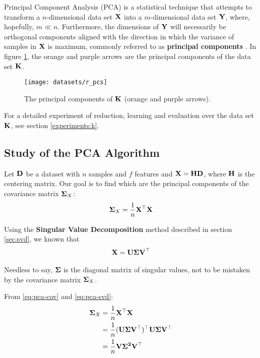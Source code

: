 Principal Component Analysis (PCA) is a statistical technique that attempts to transform a $n$-dimensional data set $\mathbf{X}$ into a $m$-dimensional data set $\mathbf{Y}$, where, hopefully, $m \ll n$. Furthermore, the dimensions of $\mathbf{Y}$ will necessarily be orthogonal components aligned with the direction in which the variance of samples in $\mathbf{X}$ is maximum, commonly referred to as \textbf{principal components} \cite{pca1989}. In figure \ref{fig:datasetrpc}, the orange and purple arrows are the principal components of the data set $\mathbf{K}$.

\begin{figure}[H]
	\centering
	\captionsetup{justification=centering}
	\texttt{[image: datasets/r\_pcs]}
	\caption{The principal components of $\mathbf{K}$ (orange and purple arrows).}
	\label{fig:datasetrpc}
\end{figure}

For a detailed experiment of reduction, learning and evaluation over the data set $\mathbf{K}$, see section \ref{experiments:k}.

\subsection{Study of the PCA Algorithm}

Let $\mathbf{D}$ be a dataset with $n$ samples and $f$ features and $\mathbf{X=HD}$, where $\mathbf{H}$ is the centering matrix. Our goal is to find which are the principal components of the covariance matrix $\mathbf{\Sigma}_X$:
\begin{align}
	\label{eq:pca-cov}
	\mathbf{\Sigma}_X=\frac{1}{n} \mathbf{X^\top X}
\end{align}

Using the \textbf{Singular Value Decomposition} method described in section \ref{sec:svd}, we known that
\begin{align}
	\label{eq:pca-svd}
	\mathbf{X = U\Sigma V^\top}
\end{align}

Needless to say, $\mathbf{\Sigma}$ is the diagonal matrix of singular values, not to be mistaken by the covariance matrix $\mathbf{\Sigma}_X$.

From \ref{eq:pca-cov} and \ref{eq:pca-svd}:
\begin{align*}
	\mathbf{\Sigma}_X &= \frac{1}{n} \mathbf{X^\top X} \\
	&= \frac{1}{n} \mathbf{(U\Sigma V^\top)^\top U\Sigma V^\top} \\
	&= \frac{1}{n} \mathbf{V\Sigma^2 V^\top}
\end{align*}

